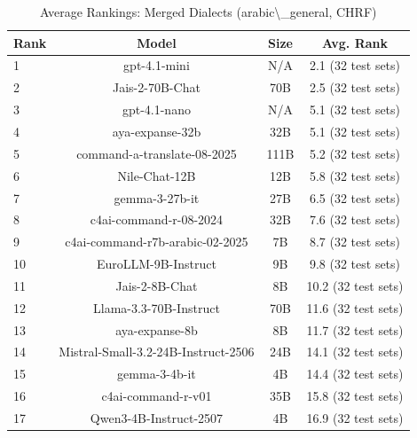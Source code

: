\begin{table}[htbp]
\centering
\caption{Average Rankings: Merged Dialects (arabic\textbackslash{}_general, CHRF)}
\label{tab:avg_rankings_chrf_arabic_general}
\begin{tabular}{l@{\hspace{3pt}}c@{\hspace{3pt}}c@{\hspace{3pt}}c}
\toprule
Rank & Model & Size & Avg. Rank \\
\midrule
1 & gpt-4.1-mini & N/A & 2.1 (32 test sets) \\
2 & Jais-2-70B-Chat & 70B & 2.5 (32 test sets) \\
3 & gpt-4.1-nano & N/A & 5.1 (32 test sets) \\
4 & aya-expanse-32b & 32B & 5.1 (32 test sets) \\
5 & command-a-translate-08-2025 & 111B & 5.2 (32 test sets) \\
6 & Nile-Chat-12B & 12B & 5.8 (32 test sets) \\
7 & gemma-3-27b-it & 27B & 6.5 (32 test sets) \\
8 & c4ai-command-r-08-2024 & 32B & 7.6 (32 test sets) \\
9 & c4ai-command-r7b-arabic-02-2025 & 7B & 8.7 (32 test sets) \\
10 & EuroLLM-9B-Instruct & 9B & 9.8 (32 test sets) \\
11 & Jais-2-8B-Chat & 8B & 10.2 (32 test sets) \\
12 & Llama-3.3-70B-Instruct & 70B & 11.6 (32 test sets) \\
13 & aya-expanse-8b & 8B & 11.7 (32 test sets) \\
14 & Mistral-Small-3.2-24B-Instruct-2506 & 24B & 14.1 (32 test sets) \\
15 & gemma-3-4b-it & 4B & 14.4 (32 test sets) \\
16 & c4ai-command-r-v01 & 35B & 15.8 (32 test sets) \\
17 & Qwen3-4B-Instruct-2507 & 4B & 16.9 (32 test sets) \\
\bottomrule
\end{tabular}
\end{table}